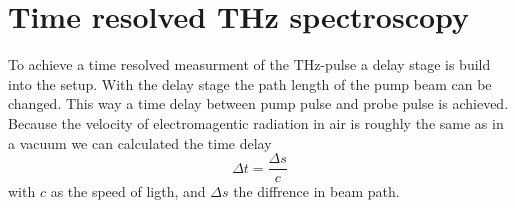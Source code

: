 \section{Time resolved THz spectroscopy}
\label{sec:time_domain}
To achieve a time resolved measurment of the $\si{\tera\hertz}$-pulse a delay stage is build into the setup.
With the delay stage the path length of the pump beam can be changed.
This way a time delay between pump pulse and probe pulse is achieved.
Because the velocity of electromagentic radiation in air is roughly the same as in a vacuum we can calculated the time delay   
\begin{equation}
    \Delta t = \frac{\Delta s}{c}
\end{equation}
with $c$ as the speed of ligth, and $\Delta s$ the diffrence in beam path.
